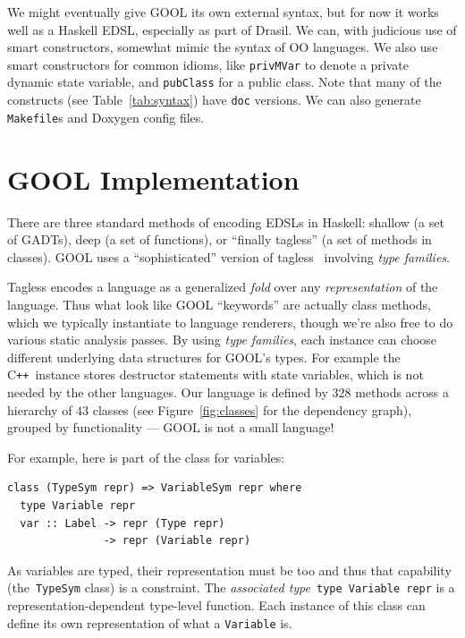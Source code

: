 \documentclass[sigplan,review,prologue,dvipsnames]{acmart}
\newcommand{\Cplusplus}{C\texttt{++}}
\begin{document}
We might eventually give GOOL its own external syntax, but for now it works
well as a Haskell EDSL, especially as part of Drasil. We can, with judicious
use of smart constructors, somewhat mimic the syntax of OO languages.
We also use smart constructors for common idioms, like
\verb|privMVar| to denote a private dynamic state variable, 
and \verb|pubClass| for a public class.  Note that many of the constructs
(see Table~\ref{tab:syntax}) have \verb|doc| versions.  We can also
generate \verb|Makefile|s and Doxygen config files.

\section{GOOL Implementation} \label{sec:implementation}

There are three standard methods of encoding EDSLs in Haskell:
shallow (a set of GADTs), deep (a set of functions), or ``finally
tagless'' (a set of methods in classes).  GOOL uses a
``sophisticated'' version of tagless~\cite{carette2009finally}
involving \emph{type families}. 

Tagless encodes a language as a generalized
\emph{fold} over any \emph{representation} of the language.  Thus what
look like GOOL ``keywords'' are actually class methods, which we typically 
instantiate to language renderers, though we're also free to do various static 
analysis passes. By using \emph{type families}, each instance can choose
different underlying data structures for GOOL's types.  For example the
\Cplusplus~instance stores destructor statements with state variables, which
is not needed by the other languages.  Our language is defined by 
$328$ methods across a hierarchy of $43$ classes (see Figure~\ref{fig:classes}
for the dependency graph), grouped by functionality 
--- GOOL is not a small language!

For example, here is part of the class for variables:
\begin{lstlisting}
class (TypeSym repr) => VariableSym repr where
  type Variable repr
  var :: Label -> repr (Type repr)
               -> repr (Variable repr)
\end{lstlisting}
As variables are typed, their representation must be too and
thus that capability (the~\verb|TypeSym| class) is a constraint.  
The \emph{associated type}~\verb|type Variable repr| is a representation-dependent
type-level function.  Each instance of this
class can define its own representation of what a
\verb|Variable| is. 
\end{document}
